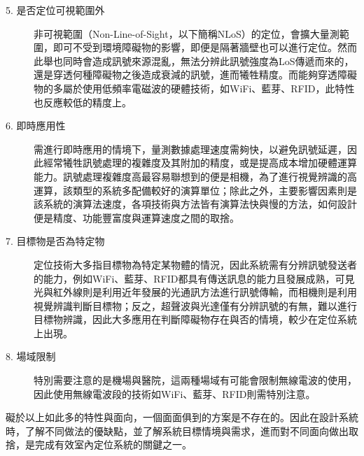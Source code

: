 \begin{description}
    


    
    \item[5. 是否定位可視範圍外] \hfill 
    
    \qquad
    非可視範圍（Non-Line-of-Sight，以下簡稱NLoS）的定位，會擴大量測範圍，即可不受到環境障礙物的影響，即便是隔著牆壁也可以進行定位。然而此舉也同時會造成訊號來源混亂，無法分辨此訊號強度為LoS傳遞而來的，還是穿透何種障礙物之後造成衰減的訊號，進而犧牲精度。而能夠穿透障礙物的多屬於使用低頻率電磁波的硬體技術，如WiFi、藍芽、RFID，此特性也反應較低的精度上。


    \item[6. 即時應用性] \hfill 
    
    \qquad
    需進行即時應用的情境下，量測數據處理速度需夠快，以避免訊號延遲，因此經常犧牲訊號處理的複雜度及其附加的精度，或是提高成本增加硬體運算能力。訊號處理複雜度高最容易聯想到的便是相機，為了進行視覺辨識的高運算，該類型的系統多配備較好的演算單位\cite{survey_light2020}；除此之外，主要影響因素則是該系統的演算法速度，各項技術與方法皆有演算法快與慢的方法，如何設計便是精度、功能豐富度與運算速度之間的取捨。
    
    \item[7. 目標物是否為特定物] \hfill 
    
    \qquad
    定位技術大多指目標物為特定某物體的情況，因此系統需有分辨訊號發送者的能力，例如WiFi、藍芽、RFID都具有傳送訊息的能力且發展成熟\cite{survey:indoor_wayfinding}，可見光與紅外線則是利用近年發展的光通訊方法進行訊號傳輸，而相機則是利用視覺辨識判斷目標物；反之，超聲波與光達僅有分辨訊號的有無，難以進行目標物辨識，因此大多應用在判斷障礙物存在與否的情境，較少在定位系統上出現。
    
    \item[8. 場域限制]\hfill 
    
    \qquad
    特別需要注意的是機場與醫院，這兩種場域有可能會限制無線電波的使用\cite{case:vlc_mobile}，因此使用無線電波段的技術如WiFi、藍芽、RFID則需特別注意。
\end{description}

\hfill

礙於以上如此多的特性與面向，一個面面俱到的方案是不存在的。因此在設計系統時，了解不同做法的優缺點，並了解系統目標情境與需求，進而對不同面向做出取捨，是完成有效室內定位系統的關鍵之一\cite{survey_indoor2018}。












